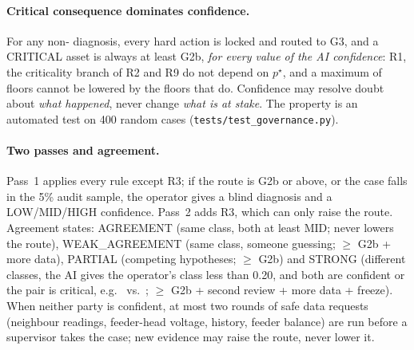 \paragraph{Critical consequence dominates confidence.} For any non-\NORM{} diagnosis, every hard action is locked
and routed to G3, and a CRITICAL asset is always at least G2b, \emph{for every value of the AI confidence}:
R1, the criticality branch of R2 and R9 do not depend on $p^\star$, and a maximum of floors cannot be lowered by
the floors that do. Confidence may resolve doubt about \emph{what happened}, never change \emph{what is at stake}.
The property is an automated test on 400 random cases (\texttt{tests/test\_governance.py}).

\paragraph{Two passes and agreement.} Pass~1 applies every rule except R3; if the route is G2b or above, or the
case falls in the 5\% audit sample, the operator gives a blind diagnosis and a LOW/MID/HIGH confidence. Pass~2
adds R3, which can only raise the route. Agreement states: AGREEMENT (same class, both at least MID; never lowers
the route), WEAK\_AGREEMENT (same class, someone guessing; $\ge$ G2b + more data), PARTIAL (competing hypotheses;
$\ge$ G2b) and STRONG (different classes, the AI gives the operator's class less than 0.20, and both are confident
or the pair is critical, e.g.\ \GE{} vs.\ \MF; $\ge$ G2b + second review + more data + freeze). When neither party
is confident, at most two rounds of safe data requests (neighbour readings, feeder-head voltage, history, feeder
balance) are run before a supervisor takes the case; new evidence may raise the route, never lower it.

